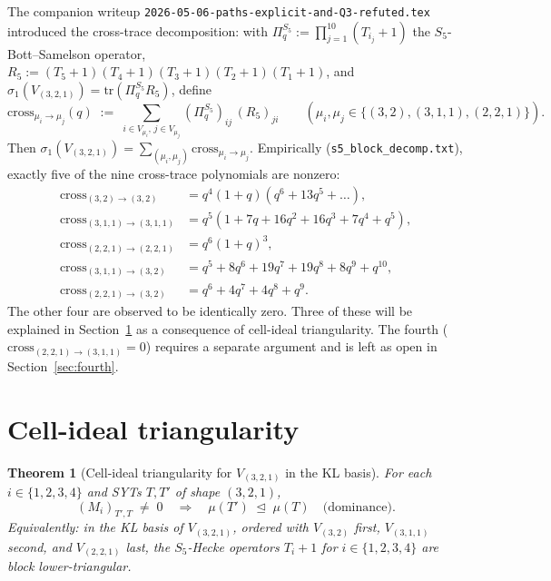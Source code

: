 \documentclass[11pt]{article}
\newtheorem{theorem}{Theorem}
\theoremstyle{definition}
\begin{document}
The companion writeup \texttt{2026-05-06-paths-explicit-and-Q3-refuted.tex} introduced the cross-trace decomposition: with $\Pi_q^{S_5} := \prod_{j=1}^{10}(T_{i_j}+1)$ the $S_5$-Bott--Samelson operator, $R_5 := (T_5+1)(T_4+1)(T_3+1)(T_2+1)(T_1+1)$, and $\sigma_1(V_{(3,2,1)}) = \mathrm{tr}(\Pi_q^{S_5} R_5)$, define
\begin{equation}\label{eq:cross-def}
\mathrm{cross}_{\mu_i \to \mu_j}(q) \;:=\; \sum_{i \in V_{\mu_i},\, j \in V_{\mu_j}} (\Pi_q^{S_5})_{ij}\, (R_5)_{ji} \qquad (\mu_i, \mu_j \in \{(3,2),(3,1,1),(2,2,1)\}).
\end{equation}
Then $\sigma_1(V_{(3,2,1)}) = \sum_{(\mu_i,\mu_j)} \mathrm{cross}_{\mu_i \to \mu_j}$. Empirically (\texttt{s5\_block\_decomp.txt}), exactly five of the nine cross-trace polynomials are nonzero:
\begin{align*}
\mathrm{cross}_{(3,2)\to(3,2)} &= q^4(1+q)(q^6+13q^5+\dots),\\
\mathrm{cross}_{(3,1,1)\to(3,1,1)} &= q^5(1+7q+16q^2+16q^3+7q^4+q^5),\\
\mathrm{cross}_{(2,2,1)\to(2,2,1)} &= q^6(1+q)^3,\\
\mathrm{cross}_{(3,1,1)\to(3,2)} &= q^5+8q^6+19q^7+19q^8+8q^9+q^{10},\\
\mathrm{cross}_{(2,2,1)\to(3,2)} &= q^6+4q^7+4q^8+q^9.
\end{align*}
The other four are observed to be identically zero. Three of these will be explained in Section~\ref{sec:cell-ideal} as a consequence of cell-ideal triangularity. The fourth ($\mathrm{cross}_{(2,2,1)\to(3,1,1)} = 0$) requires a separate argument and is left as open in Section~\ref{sec:fourth}.

\section{Cell-ideal triangularity}\label{sec:cell-ideal}

\begin{theorem}[Cell-ideal triangularity for $V_{(3,2,1)}$ in the KL basis]\label{thm:cell-ideal}
For each $i \in \{1, 2, 3, 4\}$ and SYTs $T, T'$ of shape $(3,2,1)$,
\begin{equation}\label{eq:cell-ideal}
(M_i)_{T', T} \;\neq\; 0 \quad \Longrightarrow \quad \mu(T') \;\trianglelefteq\; \mu(T) \quad \text{(dominance).}
\end{equation}
Equivalently: in the KL basis of $V_{(3,2,1)}$, ordered with $V_{(3,2)}$ first, $V_{(3,1,1)}$ second, and $V_{(2,2,1)}$ last, the $S_5$-Hecke operators $T_i+1$ for $i \in \{1,2,3,4\}$ are block lower-triangular.
\end{theorem}
\end{document}
